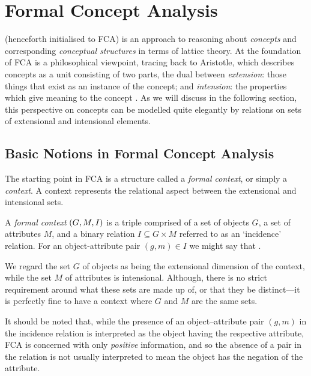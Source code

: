 \chapter{Formal Concept Analysis}
\label{chapter:formal-concept-analysis}

\FCA (henceforth initialised to FCA) is an approach to reasoning about \textit{concepts} and corresponding \textit{conceptual structures} in terms of lattice theory. At the foundation of FCA is a philosophical viewpoint, tracing back to Aristotle, which describes concepts as a unit consisting of two parts, the dual between \textit{extension}: those things that exist as an instance of the concept; and \textit{intension}: the properties which give meaning to the concept \cite[p. 1]{WILLE1992493} \cite[p. 414]{DUQUENNE1999407}. As we will discuss in the following section, this perspective on concepts can be modelled quite elegantly by relations on sets of extensional and intensional elements.  

\section{Basic Notions in Formal Concept Analysis}
\label{section:basic-notions}

The starting point in FCA is a structure called a \textit{formal context}, or simply a \textit{context}. A context represents the relational aspect between the extensional and intensional sets.
%
\begin{definition}
\label{definition:formal-context} 
  A \textit{formal context} $(G,M,\mathrel{I})$ is a triple comprised of a set of objects $G$, a set of attributes $M$, and a binary relation $I \subseteq G \times M$ referred to as an `incidence' relation. For an object-attribute pair $(g,m) \in I$ we might say that .
\end{definition}
%
We regard the set $G$ of objects as being the extensional dimension of the context, while the set $M$ of attributes is intensional. Although, there is no strict requirement around what these sets are made up of, or that they be distinct---it is perfectly fine to have a context where $G$ and $M$ are the same sets.

It should be noted that, while the presence of an object–attribute pair $(g,m)$ in the incidence relation is interpreted as the object having the respective attribute, FCA is concerned with only \textit{positive} information, and so the absence of a pair in the relation is not usually interpreted to mean the object has the negation of the attribute.

